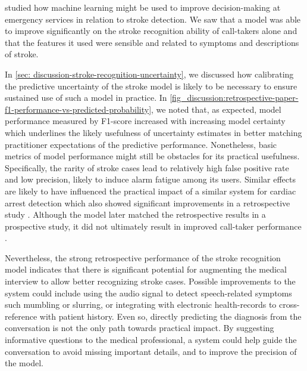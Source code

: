 




\vspace{1em}
\textbf{} studied how machine learning might be used to improve decision-making at emergency services in relation to stroke detection. 
We saw that a model was able to improve significantly on the stroke recognition ability of call-takers alone and that the features it used were sensible and related to symptoms and descriptions of stroke. 

In \cref{sec: discussion-stroke-recognition-uncertainty}, we discussed how calibrating the predictive uncertainty of the stroke model is likely to be necessary to ensure sustained use of such a model in practice. In \cref{fig_discussion:retrospective-paper-f1-performance-vs-predicted-probability}, we noted that, as expected, model performance measured by F1-score increased with increasing model certainty which underlines the likely usefulness of uncertainty estimates in better matching practitioner expectations of the predictive performance. 
Nonetheless, basic metrics of model performance might still be obstacles for its practical usefulness. Specifically, the rarity of stroke cases lead to relatively high false positive rate and low precision, likely to induce alarm fatigue among its users. Similar effects are likely to have influenced the practical impact of a similar system for cardiac arrest detection which also showed significant improvements in a retrospective study \parencite{cite14}. Although the model later matched the retrospective results in a prospective study, it did not ultimately result in improved call-taker performance \parencite{cite15}. 

Nevertheless, the strong retrospective performance of the stroke recognition model indicates that there is significant potential for augmenting the medical interview to allow better recognizing stroke cases. 
Possible improvements to the system could include using the audio signal to detect speech-related symptoms such mumbling or slurring, or integrating with electronic health-records to cross-reference with patient history. 
Even so, directly predicting the diagnosis from the conversation is not the only path towards practical impact. By suggesting informative questions to the medical professional, a system could help guide the conversation to avoid missing important details, and to improve the precision of the model. 



